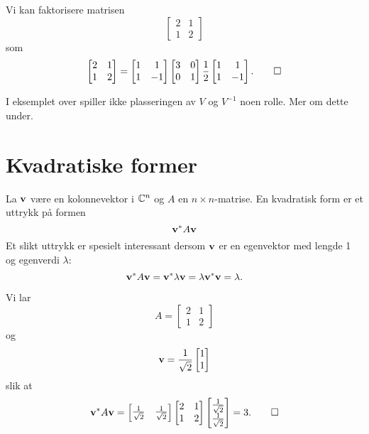 \begin{ex}
Vi kan faktorisere matrisen 
\[
\begin{bmatrix}
2     & 1 \\
1      & 2
\end{bmatrix}
\]
som
\[
\begin{bmatrix}
2     & 1 \\
1      & 2
\end{bmatrix}
=
\begin{bmatrix}
1 & 1 \\ 1 &-1
\end{bmatrix}
\begin{bmatrix}
3     & 0 \\
0      & 1
\end{bmatrix}
\frac{1}{2}
\begin{bmatrix}
1 & 1 \\ 1 &-1
\end{bmatrix}.\qedhere
\]
\end{ex}
\begin{merkx}
I eksemplet over spiller ikke plasseringen av $V$ og $V^{-1}$ noen rolle. Mer om dette under.
\end{merkx}

\section*{Kvadratiske former}
La $\mathbf{v}$ være en kolonnevektor i $\mathbb{C}^n$ og $A$ en $n\times n$-matrise. En kvadratisk form er et uttrykk på formen 
\[
\mathbf{v}^* A \mathbf{v}
\]
Et slikt uttrykk er spesielt interessant dersom $\mathbf{v}$ er en egenvektor med lengde 1 og egenverdi $\lambda$:
\[
\mathbf{v}^* A \mathbf{v}=\mathbf{v}^* \lambda \mathbf{v}=\lambda \mathbf{v}^* \mathbf{v}=\lambda.
\]

\begin{ex}
Vi lar 
\[
A=
\begin{bmatrix}
2     & 1 \\
1      & 2
\end{bmatrix}
\]
og 
\[
\mathbf{v}=
\frac{1}{\sqrt{2}}
\begin{bmatrix}
1    \\
1    
\end{bmatrix}
\]
slik at 
\[
\mathbf{v}^* A \mathbf{v}=
\begin{bmatrix}
\frac{1}{\sqrt{2}}   & \frac{1}{\sqrt{2}}    
\end{bmatrix}
\begin{bmatrix}
2     & 1 \\
1      & 2
\end{bmatrix}
\begin{bmatrix}
\frac{1}{\sqrt{2}}    \\
\frac{1}{\sqrt{2}}    
\end{bmatrix}
=3. \qedhere
\]
\end{ex}

